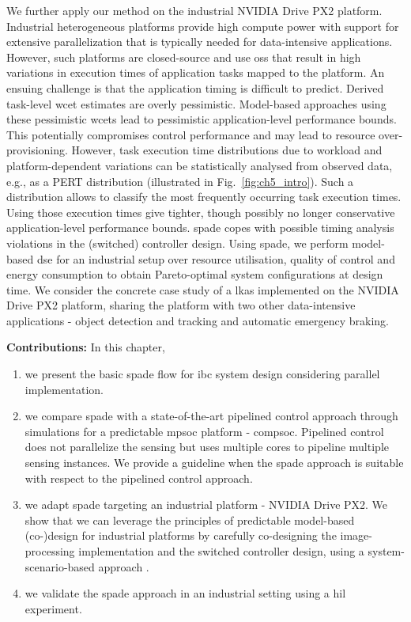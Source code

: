 We further apply our method on the industrial NVIDIA Drive PX2 platform. Industrial heterogeneous platforms provide high compute power with support for extensive parallelization that is typically needed for data-intensive applications. However, such platforms  are closed-source and use \glspl{os} that result in high variations in execution times of application tasks mapped to the platform.
An ensuing challenge is that the application timing is difficult to predict. Derived task-level \gls{wcet} estimates are overly pessimistic.
Model-based approaches using these pessimistic \glspl{wcet} lead to pessimistic application-level performance bounds. This potentially compromises control performance and may lead to resource over-provisioning. 
However, task execution time distributions due to workload and platform-dependent variations can be statistically analysed from observed data, e.g., as a PERT distribution \cite{adyanthaya2014robustness} (illustrated in Fig.\ \ref{fig:ch5_intro}). Such a distribution allows to classify the most frequently occurring task execution times. Using those  execution times give tighter, though possibly no longer conservative application-level performance bounds. \gls{spade} copes with possible timing analysis violations in the (switched) controller design. Using \gls{spade}, we  perform model-based \gls{dse} for an industrial setup over resource utilisation, quality of control and energy consumption to obtain Pareto-optimal system configurations at design time. We consider the concrete case study of a \gls{lkas} implemented on the NVIDIA Drive PX2 platform, sharing the platform with two other data-intensive applications - object detection and tracking and automatic emergency braking.

\textbf{Contributions:} In this chapter, 
\begin{enumerate}
\item we present the basic \gls{spade} flow for \gls{ibc} system design considering parallel implementation.
    \item we compare \gls{spade} with a state-of-the-art pipelined control approach \cite{medina2019designing} through simulations for a predictable \gls{mpsoc} platform - \gls{compsoc}. Pipelined control does not parallelize the sensing but uses multiple cores to pipeline multiple sensing instances. We provide a guideline when the \gls{spade} approach is suitable with respect to the pipelined control approach. 
    
    \item we adapt \gls{spade} targeting an industrial platform - NVIDIA Drive PX2. We show that we can leverage the principles of predictable model-based \mbox{(co-)}design for industrial platforms by carefully co-designing the image-processing implementation and the switched controller design, using a system-scenario-based approach \cite{gheorghita2009system}.

    \item we validate the \gls{spade} approach in an industrial setting using a \gls{hil} experiment. 
\end{enumerate}